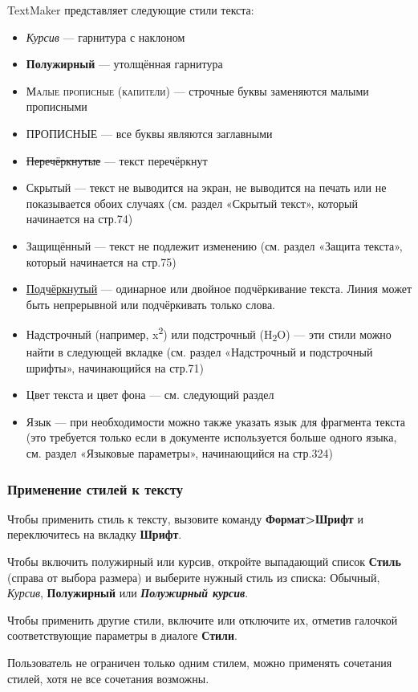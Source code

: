 \documentclass[a4paper,10pt]{article}
\begin{document}
TextMaker представляет следующие стили текста:
\begin{itemize}
 \item \textit{Курсив} — гарнитура с наклоном
 \item \textbf{Полужирный} — утолщённая гарнитура
 \item \textsc{Малые прописные (капители)} --- строчные буквы заменяются малыми прописными
 \item ПРОПИСНЫЕ --- все буквы являются заглавными
 \item \sout{Перечёркнутые} — текст перечёркнут
 \item Скрытый — текст не выводится на экран, не выводится на печать или не показывается обоих случаях (см. раздел «Скрытый текст», который начинается на стр.74)
 \item Защищённый — текст не подлежит изменению (см. раздел «Защита текста», который начинается на стр.75)
 \item \underline{Подчёркнутый} — одинарное или двойное подчёркивание текста. Линия может быть непрерывной или подчёркивать только слова.
 \item Надстрочный (например, x\textsuperscript{2}) или подстрочный (H\textsubscript{2}O) — эти стили можно найти в следующей вкладке (см. раздел «Надстрочный и подстрочный шрифты», начинающийся на стр.71)
 \item Цвет текста и цвет фона — см. следующий раздел
 \item Язык — при необходимости можно также указать язык для фрагмента текста (это требуется только если в документе используется больше одного языка, см. раздел «Языковые параметры», начинающийся на стр.324)
\end{itemize}

\subsubsection{Применение стилей к тексту}
Чтобы применить стиль к тексту, вызовите команду \textbf{Формат>Шрифт} и переключитесь на вкладку \textbf{Шрифт}.

Чтобы включить полужирный или курсив, откройте выпадающий список \textbf{Стиль} (справа от выбора размера) и выберите нужный стиль из списка: Обычный, \textit{Курсив}, \textbf{Полужирный} или \textit{\textbf{Полужирный курсив}}.

Чтобы применить другие стили, включите или отключите их, отметив галочкой соответствующие параметры в диалоге \textbf{Стили}.

Пользователь не ограничен только одним стилем, можно применять сочетания стилей, хотя не все сочетания возможны.
\end{document}
